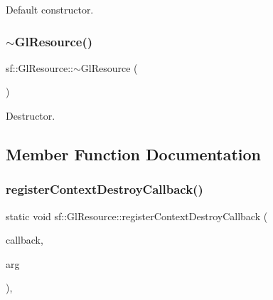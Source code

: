 Default constructor. 

\begin{DoxyVerb}\end{DoxyVerb}
 \mbox{\label{classsf_1_1_gl_resource_ab99035b67052331d1e8cf67abd93de98}} 
\subsubsection{\texorpdfstring{$\sim$GlResource()}{~GlResource()}}
{\footnotesize\ttfamily sf\+::\+Gl\+Resource\+::$\sim$\+Gl\+Resource (\begin{DoxyParamCaption}{ }\end{DoxyParamCaption})\hspace{0.3cm}{\ttfamily [protected]}}



Destructor. 

\begin{DoxyVerb}\end{DoxyVerb}
 

\subsection{Member Function Documentation}
\mbox{\label{classsf_1_1_gl_resource_ab171bdaf5eb36789da14b30a846db471}} 
\subsubsection{\texorpdfstring{registerContextDestroyCallback()}{registerContextDestroyCallback()}}
{\footnotesize\ttfamily static void sf\+::\+Gl\+Resource\+::register\+Context\+Destroy\+Callback (\begin{DoxyParamCaption}\item[{Context\+Destroy\+Callback}]{callback,  }\item[{void $\ast$}]{arg }\end{DoxyParamCaption})\hspace{0.3cm}{\ttfamily [static]}, {\ttfamily [protected]}}



